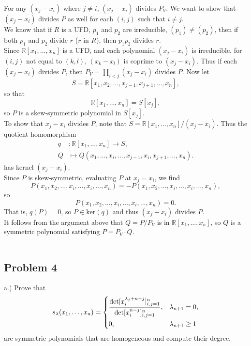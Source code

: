 \documentclass[12pt]{article}
\begin{document}
For any $(x_j - x_i)$ where $j \neq i$, $(x_j - x_i)$ divides $P_V$. 
We want to show that $(x_j - x_i)$ divides $P$ as well for each $(i,j)$ such that $i \neq j$.\\

We know that if $R$ is a UFD, $p_1$ and $p_2$ are irreducible, $(p_1) \neq (p_2)$, then if both $p_1$ and $p_2$ divide $r$ ($r$ in $R$), then $p_1p_2$ divides $r$.\\

Since $\mathbb{R}[x_1, \dots, x_n]$ is a UFD, and each polynomial $(x_j - x_i)$ is irreducible, for $(i, j)$ not equal to $(k, l)$, 
$(x_k - x_l)$ is coprime to $(x_j -x_i)$. Thus if each $(x_j-x_i)$ divides $P$, then $P_V = \prod_{i < j} (x_j - x_i)$ divides $P$. Now let
$$S = \mathbb{R}[x_1, x_2, \dots, x_{j-1}, x_{j+1} , \dots, x_n],$$
so that
$$\mathbb{R}[x_1, \dots, x_n] = S[x_j],$$
so $P$ is a skew-symmetric polynomial in $S[x_j]$.\\

To show that $x_j-x_i$ divides $P$, note that $S = \mathbb{R}[x_1,\dots,x_n]/(x_j-x_i)$. Thus the quotient homomorphism 
\begin{align*}
q &: \mathbb{R}[x_1,\dots,x_n] \longrightarrow S,\\
Q &\mapsto Q(x_1,\dots,x_i,\dots,x_{j-1},x_i,x_{j+1},\dots,x_n).
\end{align*}
has kernel $(x_j - x_i)$.\\

Since $P$ is skew-symmetric, evaluating $P$ at $x_j = x_i$, we find
$$P (x_1, x_2, \dots, x_i, \dots , x_i, \dots, x_n) 
= -P(x_1, x_2, \dots, x_i, \dots, x_i, \dots, x_n),$$
so
$$P(x_1, x_2, \dots, x_i, \dots, x_i, \dots, x_n) =  0.$$
That is, $q(P) = 0$, so $P\in \mathrm{ker}(q)$ and thus $(x_j - x_i)$  divides $P$.\\

It follows from the argument above that $Q = P/P_V$ is in $\mathbb{R}[x_1,\dots,x_n]$, so $Q$ is a symmetric polynomial satisfying $P = P_V\cdot Q$.\\\\

	\subsection*{Problem 4}

a.) Prove that 
\[
s_\lambda(x_1,\dots,x_n) = \begin{dcases}
\frac{\det [x_i^{\lambda_j+n-j}]_{i,j=1}^n}{\det [x_i^{n-j}]_{i,j=1}^n}, & \lambda_{n+1}=0,\\
0, & \lambda_{n+1}\geq 1
\end{dcases}
\]
are symmetric polynomials that are homogeneous and compute their degree.\\ 
\end{document}
